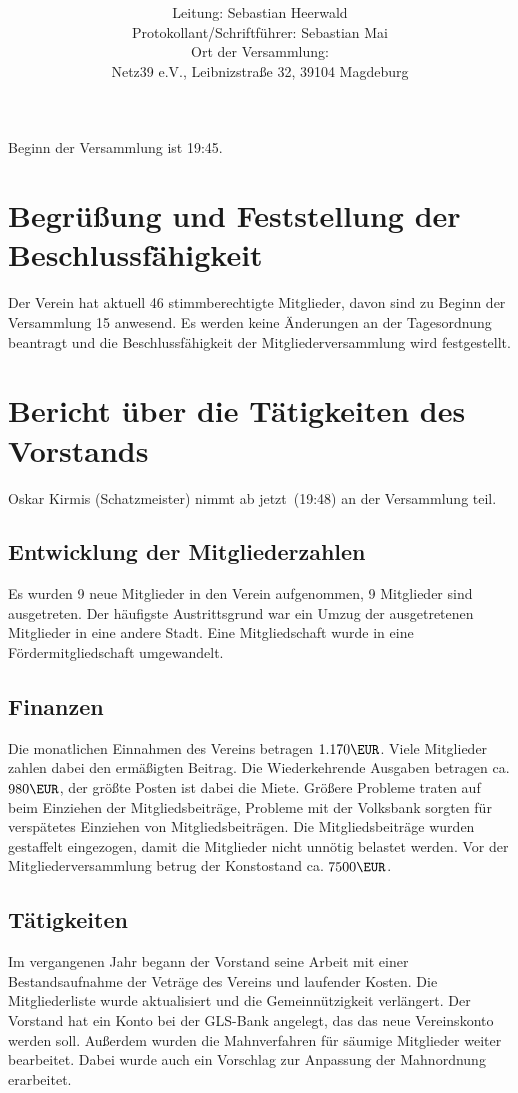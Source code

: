 \documentclass[a4paper,12pt,titlepage]{scrartcl}
\title{ \logo \\ \vspace{0.2\baselineskip} \thetitle}
\author{
Leitung: Sebastian Heerwald\\
Protokollant/Schriftführer: Sebastian Mai \\
Ort der Versammlung:\\ Netz39 e.V., Leibnizstraße 32, 39104 Magdeburg \\
}
\date{\displaydate{date}} %
\begin{document}
\maketitle
\tableofcontents

\clearpage

Beginn der Versammlung ist 19:45.

\section{Begrüßung und Feststellung der Beschlussfähigkeit}

Der Verein hat aktuell 46 stimmberechtigte Mitglieder, davon sind zu Beginn der Versammlung 15 anwesend. Es werden keine Änderungen an der Tagesordnung beantragt und die Beschlussfähigkeit der Mitgliederversammlung wird festgestellt.

\section{Bericht über die Tätigkeiten des Vorstands}
Oskar Kirmis (Schatzmeister) nimmt ab jetzt~(19:48) an der Versammlung teil.

\subsection{Entwicklung der Mitgliederzahlen}
Es wurden 9 neue Mitglieder in den Verein aufgenommen, 9 Mitglieder sind ausgetreten. Der häufigste Austrittsgrund war ein Umzug der ausgetretenen Mitglieder in eine andere Stadt. Eine Mitgliedschaft wurde in eine Fördermitgliedschaft umgewandelt.

\subsection{Finanzen}
Die monatlichen Einnahmen des Vereins betragen $1.170\EUR$. Viele Mitglieder zahlen dabei den ermäßigten Beitrag. Die Wiederkehrende Ausgaben betragen ca. $980\EUR$, der größte Posten ist dabei die Miete.
Größere Probleme traten auf beim Einziehen der Mitgliedsbeiträge, Probleme mit der Volksbank sorgten für verspätetes Einziehen von Mitgliedsbeiträgen. Die Mitgliedsbeiträge wurden gestaffelt eingezogen, damit die Mitglieder nicht unnötig belastet werden.
Vor der Mitgliederversammlung betrug der Konstostand ca. $7500\EUR$.

\subsection{Tätigkeiten}
Im vergangenen Jahr begann der Vorstand seine Arbeit mit einer Bestandsaufnahme der Veträge des Vereins und laufender Kosten. Die Mitgliederliste wurde aktualisiert und die Gemeinnützigkeit verlängert. Der Vorstand hat ein Konto bei der GLS-Bank angelegt, das das neue Vereinskonto werden soll. Außerdem wurden die Mahnverfahren für säumige Mitglieder weiter bearbeitet. Dabei wurde auch ein Vorschlag zur Anpassung der Mahnordnung erarbeitet.
\end{document}
